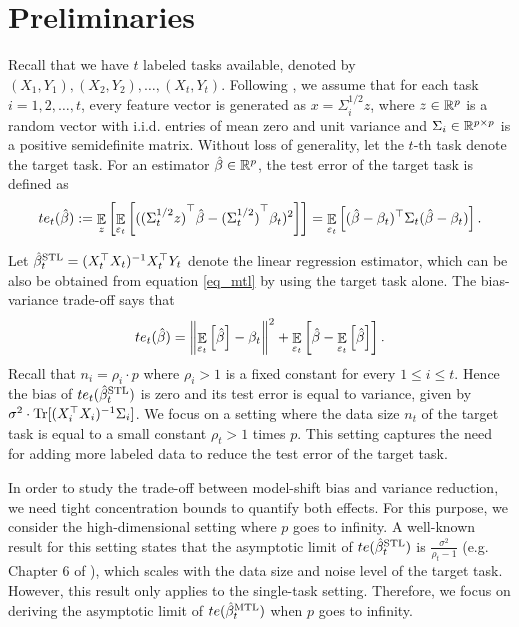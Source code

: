 \section{Preliminaries}\label{sec_setup}

Recall that we have $t$ labeled tasks available, denoted by $(X_1, Y_1), (X_2, Y_2), \dots, (X_t, Y_t)$.
Following \cite{HMRT19,BLLT20}, we assume that for each task $i = 1,2,\dots,t$,  every feature vector is generated as $x = \Sigma_i^{1/2} z$, where $z\in\mathbb{R}^p$ is a random vector with i.i.d. entries of mean zero and unit variance and $\Sigma_i\in\mathbb{R}^{p\times p}$ is a positive semidefinite matrix.
Without loss of generality, let the $t$-th task denote the target task.
For an estimator $\hat{\beta}\in\mathbb{R}^p$, the test error of the target task is defined as
	\begin{align*}
		te_t(\hat{\beta}) := \mathop{\mathbb{E}}_{z}\left[ \mathop{\mathbb{E}}_{\varepsilon_t}\left[ ({(\Sigma_t^{1/2} z)}^{\top}\hat{\beta} - {(\Sigma_t^{1/2})}^{\top}\beta_t)^2 \right] \right]
		= \mathop{\mathbb{E}}_{\varepsilon_t}\left[ (\hat{\beta} - \beta_t)^{\top}\Sigma_t(\hat{\beta} - \beta_t) \right].
	\end{align*}

Let $\hat{\beta}_t^{\text{STL}} = (X_t^{\top}X_t)^{-1}X_t^{\top}Y_t$ denote the linear regression estimator, which can be also be obtained from equation \eqref{eq_mtl} by using the target task alone.
The bias-variance trade-off \cite{HTF09} says that
	\[ te_t(\hat{\beta}) =
		\left\| \mathop{\mathbb{E}}_{\varepsilon_t}\left[ \hat{\beta} \right] - \beta_t \right\|^2 + \mathop{\mathbb{E}}_{\varepsilon_t}\left[ \hat{\beta} - \mathop{\mathbb{E}}_{\varepsilon_t}\left[ \hat{\beta} \right] \right]. \]
Recall that $n_i = \rho_i \cdot p$ where $\rho_i > 1$ is a fixed constant for every $1\le i\le t$.
Hence the bias of $te_t(\hat{\beta}_t^{\text{STL}})$ is zero and its test error is equal to variance, given by $\sigma^2 \cdot \operatorname{Tr}[(X_i^{\top}X_i)^{-1}\Sigma_i]$.
We focus on a setting where the data size $n_t$ of the target task is equal to a small constant $\rho_t > 1$ times $p$.
This setting captures the need for adding more labeled data to reduce the test error of the target task.

In order to study the trade-off between model-shift bias and variance reduction, we need tight concentration bounds to quantify both effects.
For this purpose, we consider the high-dimensional setting where $p$ goes to infinity.
A well-known result for this setting states that the asymptotic limit of $te(\hat{\beta}_t^{\text{STL}})$ is $\frac {\sigma^2} {\rho_t - 1}$ (e.g. Chapter 6 of \cite{S07}), which scales with the data size and noise level of the target task.
However, this result only applies to the single-task setting.
Therefore, we focus on deriving the asymptotic limit of $te(\hat{\beta}_t^{\text{MTL}})$ when $p$ goes to infinity.

